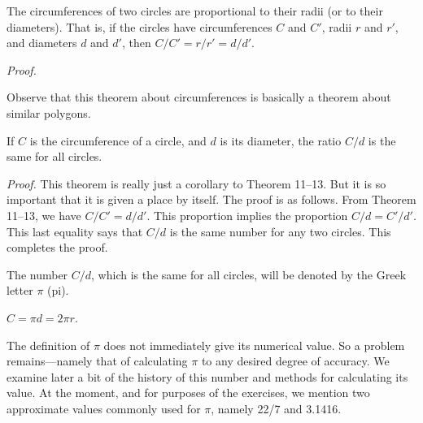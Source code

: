 \documentclass[11pt]{book}
\theoremstyle{XIplainnote}
\theoremstyle{bkplain}
\begin{document}
\begin{theorem}
The circumferences of two circles are proportional to their radii (or to their
diameters). That is, if the circles have circumferences $C$ and $C'$, radii $r$
and $r'$, and diameters $d$ and $d'$, then $C/C' = r/r' = d/d'$.
\end{theorem}

\noindent\emph{Proof.}
\begin{steps}
\end{steps}

\begin{remark}
Observe that this theorem about circumferences is basically a theorem about
similar polygons.
\end{remark}

\begin{theorem}
If $C$ is the circumference of a circle, and $d$ is its diameter, the ratio
$C/d$ is the same for all circles.
\end{theorem}

\noindent\emph{Proof.} This theorem is really just a corollary to Theorem
11--13. But it is so important that it is given a place by itself. The proof is
as follows. From Theorem 11--13, we have $C/C' = d/d'$. This proportion implies
the proportion $C/d = C'/d'$. This last equality says that $C/d$ is the same
number for any two circles. This completes the proof.

\begin{definition}
The number $C/d$, which is the same for all circles, will be denoted by the
Greek letter $\pi$ (pi).
\end{definition}

\begin{corollary}
$C = \pi d = 2\pi r$.
\end{corollary}

\begin{remark}
The definition of $\pi$ does not immediately give its numerical
value. So a problem remains---namely that of calculating $\pi$ to any desired
degree of accuracy. We examine later a bit of the history of this number and
methods for calculating its value. At the moment, and for purposes of the
exercises, we mention two approximate values commonly used for $\pi$, namely
22/7 and 3.1416.
\end{remark}
\end{document}
